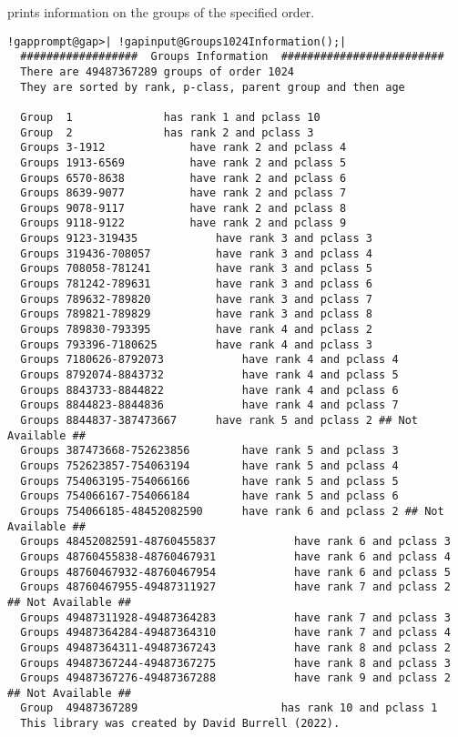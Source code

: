 \documentclass[a4paper,11pt]{report}
\begin{document}
{{{ prints information on the groups of the specified order. 
\begin{Verbatim}[commandchars=!@|,fontsize=\small,frame=single,label=Example]
  !gapprompt@gap>| !gapinput@Groups1024Information();|
  ##################  Groups Information  #########################
  There are 49487367289 groups of order 1024
  They are sorted by rank, p-class, parent group and then age
  
  Group  1				has rank 1 and pclass 10
  Group  2				has rank 2 and pclass 3
  Groups 3-1912				have rank 2 and pclass 4
  Groups 1913-6569			have rank 2 and pclass 5
  Groups 6570-8638			have rank 2 and pclass 6
  Groups 8639-9077			have rank 2 and pclass 7
  Groups 9078-9117			have rank 2 and pclass 8
  Groups 9118-9122			have rank 2 and pclass 9
  Groups 9123-319435			have rank 3 and pclass 3
  Groups 319436-708057			have rank 3 and pclass 4
  Groups 708058-781241			have rank 3 and pclass 5
  Groups 781242-789631			have rank 3 and pclass 6
  Groups 789632-789820			have rank 3 and pclass 7
  Groups 789821-789829			have rank 3 and pclass 8
  Groups 789830-793395			have rank 4 and pclass 2
  Groups 793396-7180625			have rank 4 and pclass 3
  Groups 7180626-8792073			have rank 4 and pclass 4
  Groups 8792074-8843732			have rank 4 and pclass 5
  Groups 8843733-8844822			have rank 4 and pclass 6
  Groups 8844823-8844836			have rank 4 and pclass 7
  Groups 8844837-387473667		have rank 5 and pclass 2 ## Not Available ##
  Groups 387473668-752623856		have rank 5 and pclass 3
  Groups 752623857-754063194		have rank 5 and pclass 4
  Groups 754063195-754066166		have rank 5 and pclass 5
  Groups 754066167-754066184		have rank 5 and pclass 6
  Groups 754066185-48452082590		have rank 6 and pclass 2 ## Not Available ##
  Groups 48452082591-48760455837	        have rank 6 and pclass 3
  Groups 48760455838-48760467931	        have rank 6 and pclass 4
  Groups 48760467932-48760467954	        have rank 6 and pclass 5
  Groups 48760467955-49487311927	        have rank 7 and pclass 2 ## Not Available ##
  Groups 49487311928-49487364283	        have rank 7 and pclass 3
  Groups 49487364284-49487364310	        have rank 7 and pclass 4
  Groups 49487364311-49487367243	        have rank 8 and pclass 2
  Groups 49487367244-49487367275	        have rank 8 and pclass 3
  Groups 49487367276-49487367288	        have rank 9 and pclass 2 ## Not Available ##
  Group  49487367289                      has rank 10 and pclass 1
  This library was created by David Burrell (2022).
\end{Verbatim}
 }

 }

 }
\end{document}
